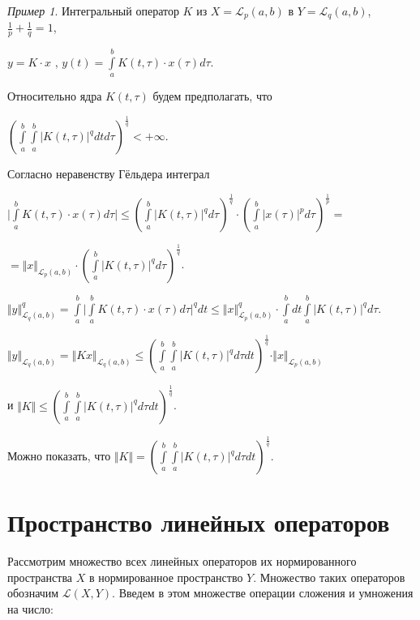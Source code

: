 \documentclass[12pt,a4paper,titlepage,oneside]{book}
\theoremstyle{definition}
\theoremstyle{plain}
\theoremstyle{remark}
\theoremstyle{remark}
\newtheorem*{example}{Пример}
\theoremstyle{remark}
\theoremstyle{remark}
\theoremstyle{plain}
\theoremstyle{plain}
\begin{document}
\begin{example}
Интегральный оператор $K$ из $X=\mathcal{L}_p(a,b)$ в $Y=\mathcal{L}_q(a,b)$, $
\frac{1}{p}+\frac{1}{q}=1$,
\begin{center}
$y=K\cdot x$ , $ y(t)=\displaystyle\int\limits_a^b K(t,\tau)\cdot x(\tau)d\tau$.
\end{center}

Относительно ядра $K(t,\tau)$ будем предполагать, что 
\begin{center}
${(\displaystyle\int\limits_a^b \displaystyle\int\limits_a^b {\vert K(t,\tau)\vert} ^q dtd\tau)^\frac{1}{q}} <+\infty$.
\end{center}

Согласно неравенству Гёльдера интеграл 
\begin{center}
$\vert \displaystyle\int\limits_a^b K(t,\tau)\cdot x(\tau)d\tau \vert \leqslant (\displaystyle\int\limits_a^b {\vert K(t,\tau)\vert} ^q d\tau)^\frac{1}{q} \cdot {(\displaystyle\int\limits_a^b {\vert x(\tau)\vert} ^p d\tau)^\frac{1}{p}=}$

$= \Vert x \Vert _{\mathcal{L}_p(a,b)}\cdot (\displaystyle\int\limits_a^b {\vert K(t,\tau)\vert} ^q d\tau)^\frac{1}{q}$.

${\Vert y \Vert}^q _{\mathcal{L}_q(a,b)}=\displaystyle\int\limits_a^b {\vert \displaystyle\int\limits_a^b K(t,\tau)\cdot x(\tau)d\tau \vert^{q}} dt\leq {\Vert x \Vert}^q _{\mathcal{L}_p(a,b)} \cdot \displaystyle\int\limits_a^b dt \displaystyle\int\limits_a^b {\vert K(t,\tau)\vert} ^q d\tau$.

${\Vert y \Vert}_{\mathcal{L}_q(a,b)}=
{\Vert Kx\Vert}_{\mathcal{L}_q(a,b)} \leqslant {(\displaystyle\int\limits_a^b \displaystyle\int\limits_a^b {\vert K(t,\tau)\vert} ^q d\tau dt)^\frac{1}{q}}\cdot \Vert x \Vert _{\mathcal{L}_p(a,b)} $ 
\end{center}
и $\Vert K \Vert \leqslant {(\displaystyle\int\limits_a^b \displaystyle\int\limits_a^b {\vert K(t,\tau)\vert} ^q d\tau dt)^\frac{1}{q}}$.

Можно показать, что $\Vert K \Vert = 
{(\displaystyle\int\limits_a^b \displaystyle\int\limits_a^b {\vert K(t,\tau)\vert} ^q d\tau dt)^\frac{1}{q}}.$
\end{example}

\section{Пространство линейных операторов}
Рассмотрим множество всех линейных операторов их нормированного пространства $X$ в нормированное пространство $Y$. Множество таких операторов обозначим $\mathcal{L}(X,Y)$. Введем в этом множестве операции сложения и умножения на число:
\end{document}
